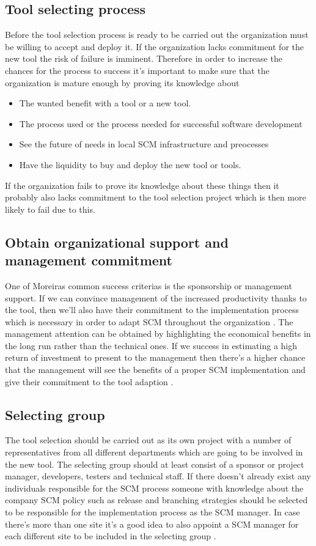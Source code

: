\documentclass[10pt]{article}
\begin{document}
\subsection{Tool selecting process}
Before the tool selection process is ready to be carried out the organization must be willing to accept and deploy it. If the organization lacks commitment for the new tool the risk of failure is imminent. Therefore in order to increase the chances for the process to success it's important to make sure that the organization is mature enough by proving its knowledge about  \cite{ABB}
\begin{itemize}
\item The wanted benefit with a tool or a new tool.
\item The process used or the process needed for successful software development
\item See the future of needs in local SCM infrastructure and preocesses
\item Have the liquidity to buy and deploy the new tool or tools.
\end{itemize}
If the organization fails to prove its knowledge about these things then it probably also lacks commitment to the tool selection project which is then more likely to fail due to this.

\subsection{Obtain organizational support and management commitment}
One of Moreiras \cite{Moreira} common success criterias is the sponsorship or management support. If we can convince management of the increased productivity thanks to the tool, then we'll also have their commitment to the implementation process which is necessary in order to adapt SCM throughout the organization \cite{Sayko}. The management attention can be obtained by highlighting the economical benefits in the long run rather than the technical ones. If we success in estimating a high return of investment to present to the management then there's a higher chance that the management will see the benefits of a proper SCM implementation and give their commitment to the tool adaption \cite{Sayko}. 

\subsection{Selecting group}
The tool selection should be carried out as its own project with a number of representatives from all different departments which are going to be involved in the new tool. The selecting group should at least consist of a sponsor or project manager, developers, testers and technical staff\cite{Sayko}. If there doesn't already exist any individuals responsible for the SCM process someone with knowledge about the company SCM policy such as release and branching strategies should be selected to be responsible for the implementation process as the SCM manager. In case there's more than one site it's a good idea to also appoint a SCM manager for each different site to be included in the selecting group \cite{ABB}.
\end{document}
